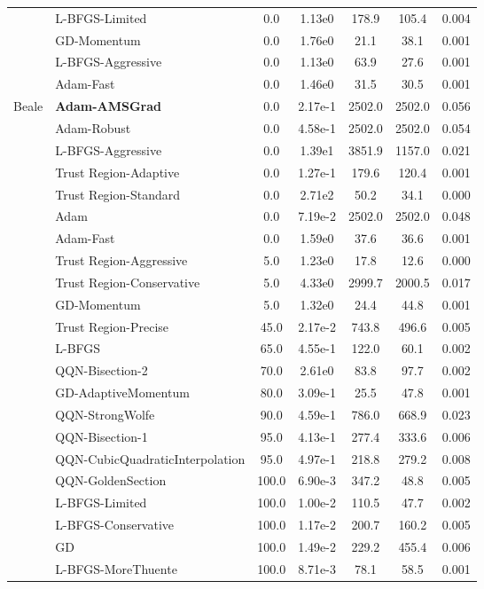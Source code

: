 \documentclass{article}
\begin{document}
\begin{table}[htbp]
{\begin{tabular}{p{2.5cm}p{2.5cm}*{5}{c}}
 & L-BFGS-Limited & 0.0 & 1.13e0 & 178.9 & 105.4 & 0.004 \\
 & GD-Momentum & 0.0 & 1.76e0 & 21.1 & 38.1 & 0.001 \\
 & L-BFGS-Aggressive & 0.0 & 1.13e0 & 63.9 & 27.6 & 0.001 \\
 & Adam-Fast & 0.0 & 1.46e0 & 31.5 & 30.5 & 0.001 \\
\midrule
\multirow{25}{*}{Beale} & \textbf{Adam-AMSGrad} & 0.0 & 2.17e-1 & 2502.0 & 2502.0 & 0.056 \\
 & Adam-Robust & 0.0 & 4.58e-1 & 2502.0 & 2502.0 & 0.054 \\
 & L-BFGS-Aggressive & 0.0 & 1.39e1 & 3851.9 & 1157.0 & 0.021 \\
 & Trust Region-Adaptive & 0.0 & 1.27e-1 & 179.6 & 120.4 & 0.001 \\
 & Trust Region-Standard & 0.0 & 2.71e2 & 50.2 & 34.1 & 0.000 \\
 & Adam & 0.0 & 7.19e-2 & 2502.0 & 2502.0 & 0.048 \\
 & Adam-Fast & 0.0 & 1.59e0 & 37.6 & 36.6 & 0.001 \\
 & Trust Region-Aggressive & 5.0 & 1.23e0 & 17.8 & 12.6 & 0.000 \\
 & Trust Region-Conservative & 5.0 & 4.33e0 & 2999.7 & 2000.5 & 0.017 \\
 & GD-Momentum & 5.0 & 1.32e0 & 24.4 & 44.8 & 0.001 \\
 & Trust Region-Precise & 45.0 & 2.17e-2 & 743.8 & 496.6 & 0.005 \\
 & L-BFGS & 65.0 & 4.55e-1 & 122.0 & 60.1 & 0.002 \\
 & QQN-Bisection-2 & 70.0 & 2.61e0 & 83.8 & 97.7 & 0.002 \\
 & GD-AdaptiveMomentum & 80.0 & 3.09e-1 & 25.5 & 47.8 & 0.001 \\
 & QQN-StrongWolfe & 90.0 & 4.59e-1 & 786.0 & 668.9 & 0.023 \\
 & QQN-Bisection-1 & 95.0 & 4.13e-1 & 277.4 & 333.6 & 0.006 \\
 & QQN-CubicQuadraticInterpolation & 95.0 & 4.97e-1 & 218.8 & 279.2 & 0.008 \\
 & QQN-GoldenSection & 100.0 & 6.90e-3 & 347.2 & 48.8 & 0.005 \\
 & L-BFGS-Limited & 100.0 & 1.00e-2 & 110.5 & 47.7 & 0.002 \\
 & L-BFGS-Conservative & 100.0 & 1.17e-2 & 200.7 & 160.2 & 0.005 \\
 & GD & 100.0 & 1.49e-2 & 229.2 & 455.4 & 0.006 \\
 & L-BFGS-MoreThuente & 100.0 & 8.71e-3 & 78.1 & 58.5 & 0.001 \\

\end{tabular}}
\end{table}
\end{document}
